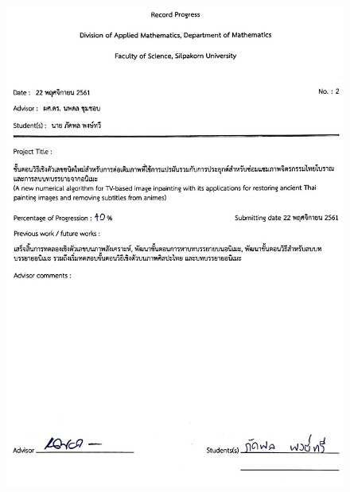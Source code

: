\begin{figure}
    \includegraphics[width=\linewidth]{image/approval_letter/report_02.jpg}
\end{figure}
\clearpage
